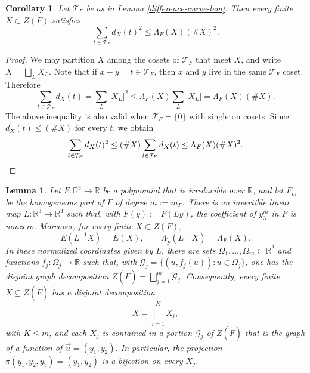 \documentclass{amsart}%
\numberwithin{equation}{section}
\newtheorem{lemma}[theorem]{Lemma}
\newtheorem{corollary}[theorem]{Corollary}
\newcommand{\ZR}{\mathbb{R}}
\newcommand{\R}{\mathbb{R}}
\newcommand{\1}{\mathbbm{1}}
\begin{document}
\begin{corollary}
\label{cor:difference curves}
Let $\mathcal T_F$ be as in Lemma \ref{difference-curve-lem}. 
Then every finite $X\subset Z(F)$ satisfies
\begin{equation}
\label{eq:stabilizer-energy}
    \sum_{t\in\mathcal T_F}d_{X}(t)^2\leq \Lambda_{F}(X)(\#X)^2.
\end{equation}
\end{corollary}

\begin{proof}
We may partition $X$ among the cosets of $\mathcal T_F$ that meet $X$, and write $X=\bigsqcup_L X_L$. 
Note that if $x-y=t\in \mathcal T_F$, then $x$ and $y$ live in the same $\mathcal T_F$ coset.
Therefore
\[
    \sum_{t\in\mathcal T_F}d_{X}(t)
    =\sum_L|X_L|^2
    \leq\Lambda_{F}(X)\sum_L|X_L|
    =\Lambda_{F}(X)(\#X).
\]
The above inequality is also valid when $\mathcal T_F=\{0\}$ with singleton cosets. 
Since $d_{X}(t)\leq(\#X)$ for every $t$, we obtain
\[
    \sum_{t\in\mathcal T_F}d_{X}(t)^2
    \leq (\#X)\sum_{t\in\mathcal T_F}d_X(t)
    \leq\Lambda_{F}(X)(\#X)^2. \qedhere
\]

\end{proof}

\medskip

\begin{lemma}
\label{lem: graph cover}
Let $F:\ZR^3\to\ZR$ be a polynomial that is irreducible over $\ZR$, and let $F_m$ be the homogeneous part of $F$ of degree $m:=m_F$.  
There is an invertible linear map $L:\R^3\to\R^3$ such that, with $\widetilde F(y):=F(Ly)$, the coefficient of $y_3^m$ in $\widetilde F$ is nonzero. 
Moreover, for every finite $X\subset  Z(F)$,
\begin{equation}
\label{eq:linear-invariance}
    E(L^{-1}X)=E(X), \qquad
    \Lambda_{\widetilde F}(L^{-1}X)=\Lambda_{F}(X).
\end{equation}
In these normalized coordinates given by $L$, there are sets $\Omega_1,\dots,\Omega_m\subset\R^2$ and functions $f_j:\Omega_j\to\R$ such that, with $\mathcal G_j=\{(u,f_j(u)):u\in\Omega_j\}$, one has the disjoint graph decomposition $Z(\widetilde F)=\bigsqcup_{j=1}^m\mathcal G_j$.
Consequently, every finite $X\subseteq  Z(\widetilde F)$ has a disjoint decomposition
\begin{equation}
\label{eq:fiber-rank-decomposition}
    X=\bigsqcup_{i=1}^K X_i,
\end{equation}
with $K\leq m$, and each $X_j$ is contained in a portion $\mathcal G_j$ of $ Z(\widetilde F)$ that is the graph of a function of $\vec{u}=(y_1,y_2)$. In particular, the projection $\pi(y_1,y_2,y_3)=(y_1,y_2)$ is a bijection on every $X_j$.
\end{lemma}
\end{document}
